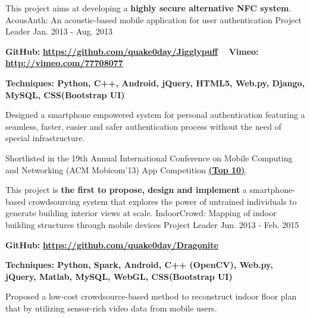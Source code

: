 \begin{cventries}
  \cventry
    {This project aims at developing a \textbf{highly secure alternative NFC system}.}
    {AcousAuth: An acoustic-based mobile application for user authentication}
    {Project Leader}
    {Jan. 2013 - Aug. 2013}
    {
      \begin{cvitems}
      \item \textbf{GitHub:} \href{https://github.com/quake0day/Jigglypuff}{\textbf{\underline{https://github.com/quake0day/Jigglypuff}}} \ \ \textbf{Vimeo:} \href{http://vimeo.com/77708077}{\textbf{\underline{http://vimeo.com/77708077}}}
      \item \textbf{Techniques: Python, C++, Android, jQuery, HTML5, Web.py, Django, MySQL, CSS(Bootstrap UI)} 
\item Designed a smartphone empowered system for personal authentication featuring
a seamless, faster, easier and safer authentication process without the need of special
infrastructure.
\item Shortlisted in the 19th Annual International Conference on Mobile Computing and Networking (ACM Mobicom'13) App Competition \href{http://www.sigmobile.org/mobicom/2013/app_finalists.html}{\textbf{\underline{(Top 10)}}}.
      \end{cvitems}
    }
  \cventry
    {This project is \textbf{the first to propose, design and implement} a smartphone-based crowdsourcing system that explores the power of untrained individuals to generate building interior views at scale.}
    {IndoorCrowd: Mapping of indoor building structures through mobile devices}
    {Project Leader}
    {Jun. 2013 - Feb. 2015}
    {
      \begin{cvitems}
            \item \textbf{GitHub:} \href{https://github.com/quake0day/Dragonite}{\textbf{\underline{https://github.com/quake0day/Dragonite}}}
      \item \textbf{Techniques: Python, Spark, Android, C++ (OpenCV), Web.py, jQuery, Matlab, MySQL, WebGL, CSS(Bootstrap UI)} 
\item Proposed a low-cost crowdsource-based method to reconstruct indoor floor plan that by utilizing sensor-rich video data from mobile users.

\end{cvitems}}
\end{cventries}
